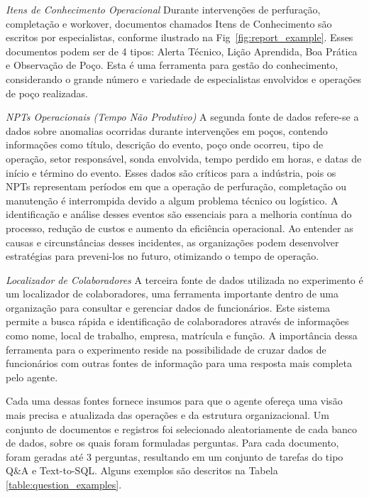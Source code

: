             
                
            \emph{Itens de Conhecimento Operacional} Durante intervenções de perfuração, completação e workover, documentos chamados Itens de Conhecimento são escritos por especialistas, conforme ilustrado na Fig~\ref{fig:report_example}. Esses documentos podem ser de 4 tipos: Alerta Técnico, Lição Aprendida, Boa Prática e Observação de Poço. Esta é uma ferramenta para gestão do conhecimento, considerando o grande número e variedade de especialistas envolvidos e operações de poço realizadas.
            
            \emph{NPTs Operacionais (Tempo Não Produtivo)} A segunda fonte de dados refere-se a dados sobre anomalias ocorridas durante intervenções em poços, contendo informações como título, descrição do evento, poço onde ocorreu, tipo de operação, setor responsável, sonda envolvida, tempo perdido em horas, e datas de início e término do evento. Esses dados são críticos para a indústria, pois os NPTs representam períodos em que a operação de perfuração, completação ou manutenção é interrompida devido a algum problema técnico ou logístico. A identificação e análise desses eventos são essenciais para a melhoria contínua do processo, redução de custos e aumento da eficiência operacional. Ao entender as causas e circunstâncias desses incidentes, as organizações podem desenvolver estratégias para preveni-los no futuro, otimizando o tempo de operação.
            
            \emph{Localizador de Colaboradores} A terceira fonte de dados utilizada no experimento é um localizador de colaboradores, uma ferramenta importante dentro de uma organização para consultar e gerenciar dados de funcionários. Este sistema permite a busca rápida e identificação de colaboradores através de informações como nome, local de trabalho, empresa, matrícula e função. A importância dessa ferramenta para o experimento reside na possibilidade de cruzar dados de funcionários com outras fontes de informação para uma resposta mais completa pelo agente.
            
            Cada uma dessas fontes fornece insumos para que o agente ofereça uma visão mais precisa e atualizada das operações e da estrutura organizacional. Um conjunto de documentos e registros foi selecionado aleatoriamente de cada banco de dados, sobre os quais foram formuladas perguntas. Para cada documento, foram geradas até 3 perguntas, resultando em um conjunto de tarefas do tipo Q\&A e Text-to-SQL. Alguns exemplos são descritos na Tabela \ref{table:question_examples}.
    
